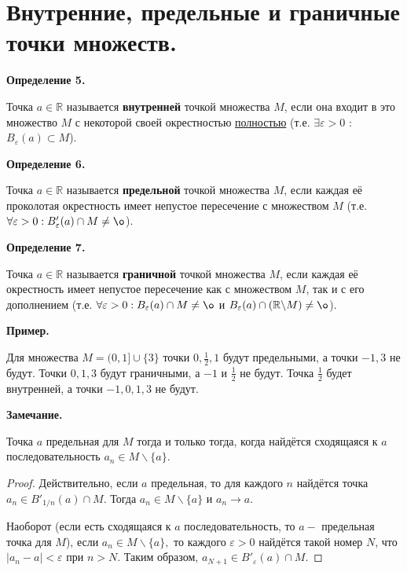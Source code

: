 \documentclass[12pt]{article}
\begin{document}
\section{Внутренние, предельные и граничные точки множеств.}

\textbf{Определение 5.}

Точка $a\in\mathbb{R}$ называется \textbf{внутренней} точкой множества $M$, если она входит в это множество $M$ с некоторой своей окрестностью \underline{полностью} (т.е. $\exists\varepsilon > 0$ : $B_\varepsilon(a)\subset M$).

\textbf{Определение 6.}

Точка $a\in\mathbb{R}$ называется \textbf{предельной} точкой множества $M$, если каждая её проколотая окрестность имеет непустое пересечение с множеством $M$ (т.е. $\forall\varepsilon > 0: B'_\varepsilon(a)\cap M\neq \o$).

\textbf{Определение 7.}

Точка $a\in\mathbb{R}$ называется \textbf{граничной} точкой множества $M$, если каждая её окрестность имеет непустое пересечение как с множеством $M$, так и с его дополнением (т.е. $\forall\varepsilon > 0: B_\varepsilon(a)\cap M\neq \o$ и $B_\varepsilon(a)\cap(\mathbb{R}\backslash M)\neq\o$).

\textbf{Пример.}

Для множества $M = (0, 1]\cup\{3\}$ точки $0, \frac{1}{2}, 1$ будут предельными, а точки $-1, 3$ не будут. Точки $0, 1, 3$ будут граничными, а $-1$ и $\frac{1}{2}$ не будут. Точка $\frac{1}{2}$ будет внутренней, а точки $-1, 0, 1, 3$ не будут.

\textbf{Замечание.}

Точка $a$ предельная для $M$ тогда и только тогда, когда найдётся сходящаяся к $a$ последовательность $a_n \in M\backslash\{a\}$. 

\begin{proof}
Действительно, если $a$ предельная, то для каждого $n$ найдётся точка \newline$a_n\in B'_{1/n}(a)\cap M$. Тогда $a_n\in M\backslash\{a\}$ и $a_n\rightarrow a.$ 

Наоборот (если есть сходящаяся к $a$ последовательность, то $a - $ предельная точка для $M$), если $a_n\in M\backslash\{a\},$ то каждого $\varepsilon>0$ найдётся такой номер $N$, что $|a_n - a|<\varepsilon$ при $n>N$. Таким образом, $a_{N+1}\in B'_\varepsilon(a)\cap M$.
\end{proof}

\newpage
\end{document}
